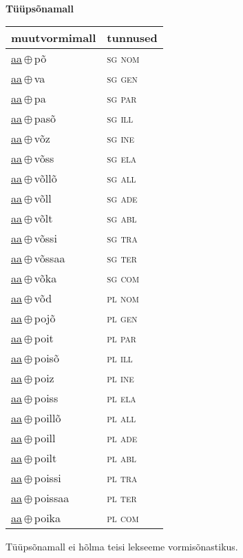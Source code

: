 \\

\vspace{3.5em}
\noindent \begin{minipage}{\textwidth}
\noindent \textbf{Tüüpsõnamall \,}\\

\begin{sideways}
\begin{tabular}{l l}
muutvormimall & tunnused \\
\hline
\underline{aa}\,$\oplus$\,põ & \textsc{ sg nom } \\
\underline{aa}\,$\oplus$\,va & \textsc{ sg gen } \\
\underline{aa}\,$\oplus$\,pa & \textsc{ sg par } \\
\underline{aa}\,$\oplus$\,pasõ & \textsc{ sg ill } \\
\underline{aa}\,$\oplus$\,võz & \textsc{ sg ine } \\
\underline{aa}\,$\oplus$\,võss & \textsc{ sg ela } \\
\underline{aa}\,$\oplus$\,võllõ & \textsc{ sg all } \\
\underline{aa}\,$\oplus$\,võll & \textsc{ sg ade } \\
\underline{aa}\,$\oplus$\,võlt & \textsc{ sg abl } \\
\underline{aa}\,$\oplus$\,võssi & \textsc{ sg tra } \\
\underline{aa}\,$\oplus$\,võssaa & \textsc{ sg ter } \\
\underline{aa}\,$\oplus$\,võka & \textsc{ sg com } \\
\underline{aa}\,$\oplus$\,võd & \textsc{ pl nom } \\
\underline{aa}\,$\oplus$\,pojõ & \textsc{ pl gen } \\
\underline{aa}\,$\oplus$\,poit & \textsc{ pl par } \\
\underline{aa}\,$\oplus$\,poisõ & \textsc{ pl ill } \\
\underline{aa}\,$\oplus$\,poiz & \textsc{ pl ine } \\
\underline{aa}\,$\oplus$\,poiss & \textsc{ pl ela } \\
\underline{aa}\,$\oplus$\,poillõ & \textsc{ pl all } \\
\underline{aa}\,$\oplus$\,poill & \textsc{ pl ade } \\
\underline{aa}\,$\oplus$\,poilt & \textsc{ pl abl } \\
\underline{aa}\,$\oplus$\,poissi & \textsc{ pl tra } \\
\underline{aa}\,$\oplus$\,poissaa & \textsc{ pl ter } \\
\underline{aa}\,$\oplus$\,poika & \textsc{ pl com } \\
\end{tabular}
\end{sideways}
\label{tab:tüüpsõnamall-aapõ}

\end{minipage}

 
\vspace{1em}
\noindent Tüüpsõnamall  ei hõlma teisi lekseeme vormi\-sõnastikus.
